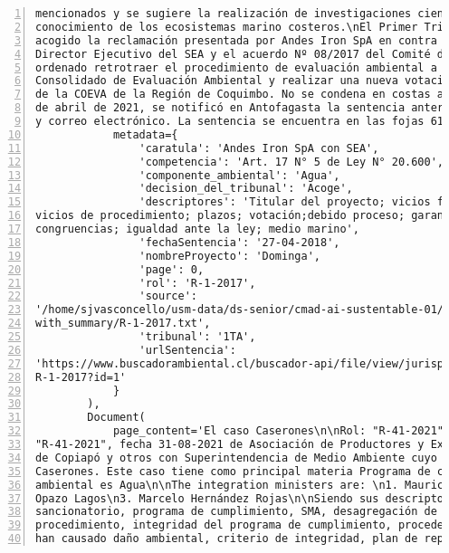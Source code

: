 \begin{Verbatim}[frame=lines, label=Elavoración propia -  Ejemplo de Contexto enviado por el Chatbot a OpenAI
				, fontsize=\scriptsize, numbers=left
				, baselinestretch=0.4
				, formatcom=\color{gray}]
mencionados y se sugiere la realización de investigaciones científicas para incrementar el
conocimiento de los ecosistemas marino costeros.\nEl Primer Tribunal Ambiental de Chile ha
acogido la reclamación presentada por Andes Iron SpA en contra de la Resolución 1146 del
Director Ejecutivo del SEA y el acuerdo Nº 08/2017 del Comité de Ministros. El tribunal ha
ordenado retrotraer el procedimiento de evaluación ambiental a la etapa posterior al Informe
Consolidado de Evaluación Ambiental y realizar una nueva votación ajustada a derecho por parte
de la COEVA de la Región de Coquimbo. No se condena en costas a las partes.\nResumen:\n\nEl 16
de abril de 2021, se notificó en Antofagasta la sentencia anterior a través del estado diario
y correo electrónico. La sentencia se encuentra en las fojas 6156.',
            metadata={
                'caratula': 'Andes Iron SpA con SEA',
                'competencia': 'Art. 17 N° 5 de Ley N° 20.600',
                'componente_ambiental': 'Agua',
                'decision_del_tribunal': 'Acoge',
                'descriptores': 'Titular del proyecto; vicios formales; motivaciòn; nulidad;
vicios de procedimiento; plazos; votación;debido proceso; garantías; contradictoriedad;
congruencias; igualdad ante la ley; medio marino',
                'fechaSentencia': '27-04-2018',
                'nombreProyecto': 'Dominga',
                'page': 0,
                'rol': 'R-1-2017',
                'source':
'/home/sjvasconcello/usm-data/ds-senior/cmad-ai-sustentable-01/etl/load/../../data/clean/docs_
with_summary/R-1-2017.txt',
                'tribunal': '1TA',
                'urlSentencia':
'https://www.buscadorambiental.cl/buscador-api/file/view/jurisprudencia/S1TA Rol N°
R-1-2017?id=1'
            }
        ),
        Document(
            page_content='El caso Caserones\n\nRol: "R-41-2021", Rol: "R-41-2021",Rol:
"R-41-2021", fecha 31-08-2021 de Asociación de Productores y Exportadores Agrícolas del Valle
de Copiapó y otros con Superintendencia de Medio Ambiente cuyo proyecto corresponde a Proyecto
Caserones. Este caso tiene como principal materia Programa de cumplimiento SMA y su coponente
ambiental es Agua\n\nThe integration ministers are: \n1. Mauricio Oviedo Gutiérrez\n2. Juan
Opazo Lagos\n3. Marcelo Hernández Rojas\n\nSiendo sus descriptores: Procedimiento
sancionatorio, programa de cumplimiento, SMA, desagregación de cargos, desviación del
procedimiento, integridad del programa de cumplimiento, procedencia del PDC, infracciones que
han causado daño ambiental, criterio de integridad, plan de reparación ambiental, incentivos

\end{Verbatim}
